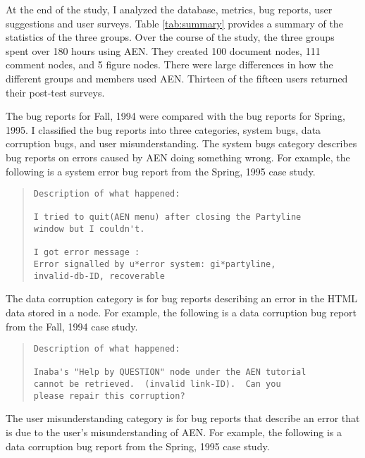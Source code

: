 At the end of the study, I analyzed the database, metrics, bug reports,
user suggestions and user surveys.  Table \ref{tab:summary} provides a
summary of the statistics of the three groups.  Over the course of the
study, the three groups spent over 180 hours using AEN. They created 100
document nodes, 111 comment nodes, and 5 figure nodes.  There were large
differences in how the different groups and members used AEN.  Thirteen of
the fifteen users returned their post-test surveys.

The bug reports for Fall, 1994 were compared with the bug reports for
Spring, 1995.  I classified the bug reports into three categories, system
bugs, data corruption bugs, and user misunderstanding.  The system bugs
category describes bug reports on errors caused by AEN doing something
wrong. For example, the following is a system error bug report from the
Spring, 1995 case study. 


\small
\begin{quote}
  \begin{verbatim}
Description of what happened: 

I tried to quit(AEN menu) after closing the Partyline 
window but I couldn't. 

I got error message :
Error signalled by u*error system: gi*partyline, 
invalid-db-ID, recoverable
  \end{verbatim}
\end{quote}
\normalsize


The data corruption category is for bug reports describing an error in
the HTML data stored in a node. For example, the following is a data
corruption bug report from the
Fall, 1994 case study.


\small 
\begin{quote}
  \begin{verbatim}
Description of what happened: 

Inaba's "Help by QUESTION" node under the AEN tutorial
cannot be retrieved.  (invalid link-ID).  Can you
please repair this corruption?
  \end{verbatim}
\end{quote}
\normalsize


The user misunderstanding category is for bug reports that describe an
error that is due to the user's misunderstanding of AEN.  For example, the
following is a data corruption bug report from the Spring, 1995 case study.

